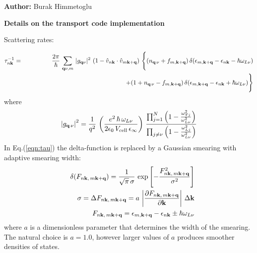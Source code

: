 \documentclass[
amsmath,amssymb,
aps,
prb,
]{revtex4}
\begin{document}
\begin{flushright}
 { {\bf Author:} Burak Himmetoglu}
\end{flushright}


\begin{center}
 {\bf Details on the transport code implementation}
\end{center}
%

Scattering rates:

\begin{eqnarray}
\tau_{n {\bf k}}^{-1} &=& \frac{2 \pi}{\hbar}\, \sum_{{\bf q} \nu, m}\, \vert g_{{\bf q} \nu} \vert^2\, 
  \left( 1 - {\hat v}_{n {\bf k}} \cdot {\hat v}_{m {\bf k+q}} \right)\, 
  \Bigg\{ (n_{{\bf q}\, \nu} + f_{m, {\bf k+q}})\, \delta( \epsilon_{m, {\bf k+q}} - \epsilon_{n {\bf k}} - \hbar\omega_{L \nu} ) \nonumber\\
%
 && \qquad\qquad\qquad\qquad\qquad\qquad\qquad\qquad
   +  (1 + n_{{\bf q}\, \nu} - f_{m, {\bf k+q}})\, \delta(\epsilon_{m, {\bf k+q}} - \epsilon_{n {\bf k}} + \hbar\omega_{L \nu} )
  \Bigg\} \label{eqn:tau}
\end{eqnarray}
% 
where 
%
\begin{equation}
\left\vert g_{{\bf q}\, \nu} \right\vert^2 = \frac{1}{q^2}\, 
  \left( \frac{e^2\, \hbar\, \omega_{L\nu}}{2 \epsilon_0\, V_{\rm cell}\, \epsilon_{\infty}} \right)\,
  \frac{\prod_{j=1}^{N} \left(1-\frac{\omega_{T j}^2}{\omega_{L \nu}^2}\right)}
       {\prod_{j \neq \nu} \left( 1 - \frac{\omega_{L j}^2}{\omega_{L \nu}^2} \right)}
\label{eqn:gnu2}
\end{equation}
%
In Eq.(\ref{eqn:tau}) the delta-function is replaced by a Gaussian smearing with adaptive smearing width:
%
\begin{eqnarray}
&& \delta(F_{n{\bf k}, \, m{\bf k+q}}) = \frac{1}{\sqrt{\pi}\, \sigma}\, 
       \exp\left[ - \frac{ F_{n{\bf k}, \, m{\bf k+q}}^2 }{\sigma^2}  \right] \nonumber\\
&& \sigma = \Delta F_{n{\bf k}, \, m{\bf k+q}} = a\, \left\vert \frac{\partial F_{n{\bf k}, \, m{\bf k+q}}}{\partial {\bf k}} \right\vert\, \Delta {\bf k} \nonumber\\
&& F_{n{\bf k}, \, m{\bf k+q}} = \epsilon_{m, {\bf k+q}} - \epsilon_{n {\bf k}} \pm \hbar\omega_{L \nu} \label{eqn:sigma}
\end{eqnarray}
%
where $a$ is a dimensionless parameter that determines the width of the smearing. The natural choice is $a=1.0$, however larger values of
$a$ produces smoother densities of states.
\end{document}
